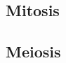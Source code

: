 \subsection{Mitosis}

\subsection{Meiosis}




\begin{noheadline}
\begin{frame}
    \begin{clickerquestion}
        \item 
        \begin{clickeroptions}
            \item 
            \item 
            \item 
            \item 
        \end{clickeroptions}
    \end{clickerquestion}
\end{frame}
\end{noheadline}
